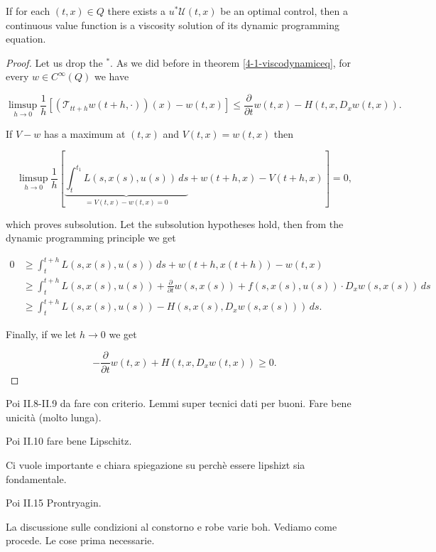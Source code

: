 \begin{theorem}
    If for each $(t,x)\in Q$ there exists a $u^{\ast}\mathcal{U}(t,x)$ be an optimal control, then a continuous value function is a viscosity solution of its dynamic programming equation.
    
    \begin{proof}
        Let us drop the $^{\ast}$. As we did before in theorem \ref{4-1-viscodynamiceq}, for every $w\in C^{\infty}(Q)$ we have

        \[\limsup_{h\to0}\frac{1}{h}\left[(\mathcal{T}_{tt+h}w(t+h,\cdot))(x)-w(t,x)\right]\leq\frac{\partial}{\partial t}w(t,x) - H(t,x,D_xw(t,x)).\]

        If $V-w$ has a maximum at $(t,x)$ and $V(t,x)=w(t,x)$ then 

        \[\limsup_{h\to0}\frac{1}{h}\left[\underbrace{\int_t^{t_1} L(s,x(s),u(s))\,ds}_{=V(t,x)-w(t,x)=0} + w(t+h,x) - V(t+h,x)\right]=0,\]

        which proves subsolution. Let the subsolution hypotheses hold, then from the dynamic programming principle we get

        \begin{align*}
            0 & \geq \int_t^{t+h} L(s,x(s),u(s)) \,ds + w(t+h,x(t+h)) - w(t,x)\\ 
            & \geq  \int_t^{t+h} L(s,x(s),u(s)) + \frac{\partial}{\partial t}w(s,x(s)) + f(s,x(s),u(s))\cdot D_x w(s,x(s)) \,ds \\
            & \geq \int_t^{t+h} L(s,x(s),u(s)) - H(s,x(s),D_x w(s,x(s))) \,ds.
        \end{align*} 

        Finally, if we let $h\to0$ we get

        \[-\frac{\partial }{\partial t} w(t,x) + H(t,x,D_xw(t,x)) \geq 0.\]

    \end{proof}
\end{theorem}



Poi II.8-II.9 da fare con criterio. Lemmi super tecnici dati per buoni. Fare bene unicità (molto lunga).

Poi II.10 fare bene Lipschitz.

Ci vuole importante e chiara spiegazione su perchè essere lipshizt sia fondamentale.

Poi II.15 Prontryagin.

La discussione sulle condizioni al constorno e robe varie boh. Vediamo come procede. Le cose prima necessarie.  